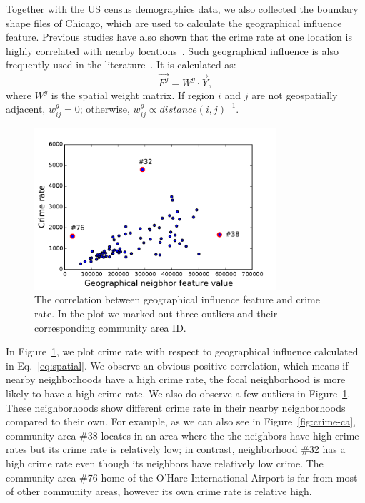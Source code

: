 Together with the US census demographics data, we also collected the boundary shape files of Chicago, which are used to calculate the geographical influence feature.
Previous studies have also shown that the crime rate at one location is highly correlated with nearby locations~\cite{GSGL01, Bur88}. Such geographical influence is also frequently used in the literature~\cite{ACC00, MoSa97}. It is calculated as:
\begin{equation}
\vec{F^g} = W^g \cdot \vec{Y},
\label{eq:spatial}
\end{equation}
where $W^g$ is the spatial weight matrix. If region $i$ and $j$ are not geospatially adjacent, $w_{ij}^g = 0$; otherwise, $w_{ij}^g \propto distance(i,j)^{-1}$.

\begin{figure}[t!]
\centering
\includegraphics[width=0.8\textwidth]{fig/spatial-crime-rate.pdf}
\caption{The correlation between geographical influence feature  and crime rate. In the plot we marked out three outliers and their corresponding community area ID.}
\label{fig:spatial}
\end{figure}

In Figure~\ref{fig:spatial},  we plot crime rate with respect to geographical influence calculated in Eq.~\ref{eq:spatial}. We observe an obvious positive correlation, which means if nearby neighborhoods have a high crime rate, the focal neighborhood is more likely to have a high crime rate. We also do observe a few outliers in Figure~\ref{fig:spatial}. These neighborhoods show different crime rate in their nearby neighborhoods compared to their own. For example, as we can also see in Figure~\ref{fig:crime-ca}, community area \#38 locates in an area where the the neighbors have high crime rates but its crime rate is relatively low; in contrast, neighborhood \#32 has a high crime rate even though its neighbors have relatively low crime. The community area \#76 home of the O'Hare International Airport is far from most of other community areas, however its own crime rate is relative high.



